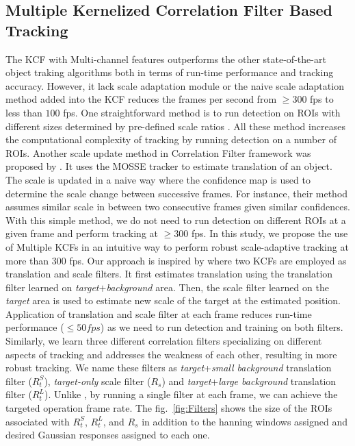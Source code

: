 \documentclass[10pt,twocolumn,letterpaper]{article}
\newcounter{ct}
\begin{document}
\subsection{Multiple Kernelized Correlation Filter Based Tracking} \label{sc:MKCF}
The KCF with Multi-channel features outperforms the other
state-of-the-art object traking algorithms both in terms of run-time
performance and tracking accuracy. However, it lack scale adaptation
module or the naive scale adaptation method added into the KCF reduces
the frames per second from $\geq300$ fps to less than $100$ fps. One
straightforward method is to run detection on ROIs with different
sizes determined by pre-defined scale ratios
\cite{henriques2015high,tang2015multi,ma2015long,bibi2015multi,li2014scale}. All
these method increases the computational complexity of tracking by
running detection on a number of ROIs. Another scale update method in
Correlation Filter framework was proposed by \cite{zhang2014fast}. It
uses the MOSSE tracker to estimate translation of an object. The scale
is updated in a naive way where the confidence map is used to
determine the scale change between successive frames. For instance,
their method assumes similar scale in between two consecutive frames
given similar confidences. With this simple method, we do not need to
run detection on different ROIs at a given frame and perform tracking
at $\geq300$ fps. In this study, we propose the use of Multiple KCFs
in an intuitive way to perform robust scale-adaptive tracking at more
than $300$ fps. Our approach is inspired by \cite{ma2015long} where
two KCFs are employed as translation and scale filters. It first
estimates translation using the translation filter learned on
\textit{target}$+$\textit{background} area. Then, the scale filter
learned on the \textit{target} area is used to estimate new scale of
the target at the estimated position. Application of translation and
scale filter at each frame reduces run-time performance ($\leq50 fps$)
as we need to run detection and training on both filters. Similarly,
we learn three different correlation filters specializing on different
aspects of tracking and addresses the weakness of each other,
resulting in more robust tracking. We name these filters as
\textit{target}+\textit{small background} translation filter
($R_{t}^{S}$), \textit{target-only} scale filter ($R_{s}$) and
\textit{target}+\textit{large background} translation filter
($R_{t}^{L}$). Unlike \cite{ma2015long}, by running a single filter at
each frame, we can achieve the targeted operation frame rate. The
fig.~\ref{fig:Filters} shows the size of the ROIs associated with
$R_{t}^{S}$, $R_{t}^{L}$, and $R_{s}$ in addition to the hanning
windows assigned and desired Gaussian responses assigned to each one.
\end{document}
